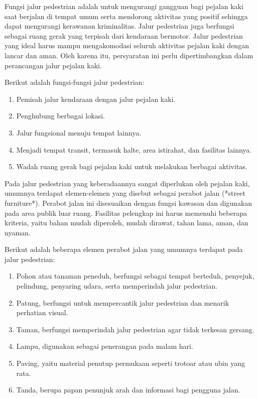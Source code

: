 \documentclass[../rumukota.tex]{subfiles}
\begin{document}
Fungsi jalur pedestrian adalah untuk mengurangi gangguan bagi pejalan kaki saat berjalan di tempat umum serta mendorong aktivitas yang positif sehingga dapat mengurangi kerawanan kriminalitas. Jalur pedestrian juga berfungsi sebagai ruang gerak yang terpisah dari kendaraan bermotor. Jalur pedestrian yang ideal harus mampu mengakomodasi seluruh aktivitas pejalan kaki dengan lancar dan aman. Oleh karena itu, persyaratan ini perlu dipertimbangkan dalam perancangan jalur pejalan kaki.

Berikut adalah fungsi-fungsi jalur pedestrian:
\begin{enumerate}
	\item Pemisah jalur kendaraan dengan jalur pejalan kaki.
	\item Penghubung berbagai lokasi.
	\item Jalur fungsional menuju tempat lainnya.
	\item Menjadi tempat transit, termasuk halte, area istirahat, dan fasilitas lainnya.
	\item Wadah ruang gerak bagi pejalan kaki untuk melakukan berbagai aktivitas.
\end{enumerate}

Pada jalur pedestrian yang keberadaannya sangat diperlukan oleh pejalan kaki, umumnya terdapat elemen-elemen yang disebut sebagai perabot jalan (*street furniture*). Perabot jalan ini disesuaikan dengan fungsi kawasan dan digunakan pada area publik luar ruang. Fasilitas pelengkap ini harus memenuhi beberapa kriteria, yaitu bahan mudah diperoleh, mudah dirawat, tahan lama, aman, dan nyaman.

Berikut adalah beberapa elemen perabot jalan yang umumnya terdapat pada jalur pedestrian:
\begin{enumerate}
	\item Pohon atau tanaman peneduh, berfungsi sebagai tempat berteduh, penyejuk, pelindung, penyaring udara, serta memperindah jalur pedestrian.
	\item Patung, berfungsi untuk mempercantik jalur pedestrian dan menarik perhatian visual.
	\item Taman, berfungsi memperindah jalur pedestrian agar tidak terkesan gersang.
	\item Lampu, digunakan sebagai penerangan pada malam hari.
	\item Paving, yaitu material penutup permukaan seperti trotoar atau ubin yang rata.
	\item Tanda, berupa papan penunjuk arah dan informasi bagi pengguna jalan.
\end{enumerate}
\end{document}
